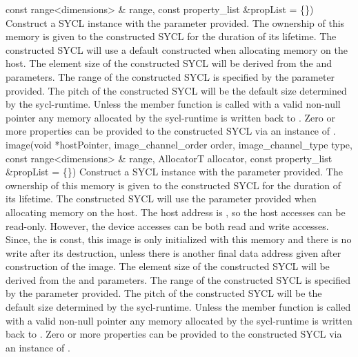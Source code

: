       { const range<dimensions> \& range, }
      { const property_list \&propList = \{\}) }
      {
         Construct a SYCL  instance with the  parameter provided. The ownership of this memory is given to the constructed SYCL  for the duration of its lifetime.
         The constructed SYCL  will use a default constructed  when allocating memory on the host.
         The element size of the constructed SYCL  will be derived from the  and  parameters.
         The range of the constructed SYCL  is specified by the  parameter provided.
         The pitch of the constructed SYCL  will be the default size determined by the \gls{sycl-runtime}.
         Unless the member function  is called with a valid non-null pointer any memory allocated by the \gls{sycl-runtime} is written back to .
         Zero or more properties can be provided to the constructed SYCL  via an instance of .
    }
    \addRowSixSL
      {image(void *hostPointer, }
      { image_channel_order order, }
      { image_channel_type type, }
      { const range<dimensions> \& range, }
      { AllocatorT allocator, }
      { const property_list \&propList = \{\}) }
      {
         Construct a SYCL  instance with the  parameter provided. The ownership of this memory is given to the constructed SYCL  for the duration of its lifetime.       
         The constructed SYCL  will use the  parameter provided when allocating memory on the host.
         The host address is , so the host accesses can be read-only. However, the device accesses can be both read and write accesses. Since, the  is const, this image is only initialized with this memory and there is no write after its destruction, unless there is another final data address given after construction of the image.
         The element size of the constructed SYCL  will be derived from the  and  parameters.
         The range of the constructed SYCL  is specified by the  parameter provided.
         The pitch of the constructed SYCL  will be the default size determined by the \gls{sycl-runtime}.
         Unless the member function  is called with a valid non-null pointer any memory allocated by the \gls{sycl-runtime} is written back to .
         Zero or more properties can be provided to the constructed SYCL  via an instance of .
      }
